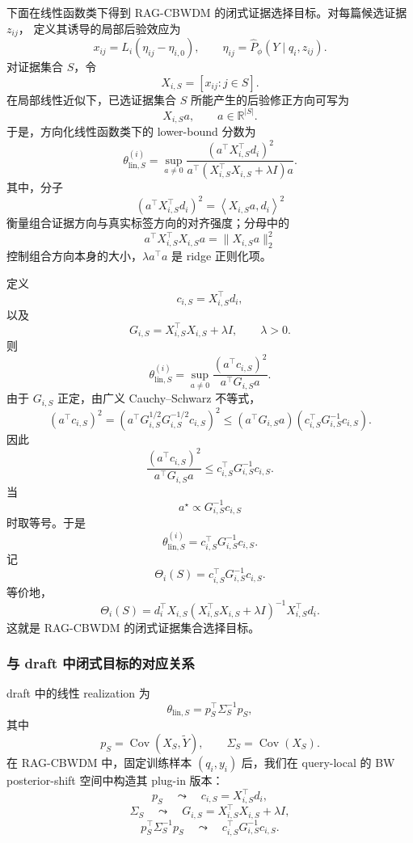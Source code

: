 \documentclass[UTF8,a4paper,12pt,oneside]{ctexart}
\numberwithin{equation}{section}
\begin{document}
下面在线性函数类下得到 RAG-CBWDM 的闭式证据选择目标。对每篇候选证据 \(z_{ij}\)，
定义其诱导的局部后验效应为
\[
    x_{ij}
    =
    L_i(\eta_{ij}-\eta_{i,0}),
    \qquad
    \eta_{ij}
    =
    \widehat P_\phi(Y\mid q_i,z_{ij}).
\]
对证据集合 \(S\)，令
\[
    X_{i,S}
    =
    [x_{ij}:j\in S].
\]
在局部线性近似下，已选证据集合 \(S\) 所能产生的后验修正方向可写为
\[
    X_{i,S}a,
    \qquad
    a\in\mathbb R^{|S|}.
\]
于是，方向化线性函数类下的 lower-bound 分数为
\[
    \theta_{\mathrm{lin},S}^{(i)}
    =
    \sup_{a\neq 0}
    \frac{
        \left(
            a^\top X_{i,S}^{\top}d_i
        \right)^2
    }{
        a^\top
        \left(
            X_{i,S}^{\top}X_{i,S}
            +
            \lambda I
        \right)
        a
    }.
\]
其中，分子
\[
    \left(
        a^\top X_{i,S}^{\top}d_i
    \right)^2
    =
    \left\langle
        X_{i,S}a,
        d_i
    \right\rangle^2
\]
衡量组合证据方向与真实标签方向的对齐强度；分母中的
\[
    a^\top X_{i,S}^{\top}X_{i,S}a
    =
    \|X_{i,S}a\|_2^2
\]
控制组合方向本身的大小，\(\lambda a^\top a\) 是 ridge 正则化项。

定义
\[
    c_{i,S}
    =
    X_{i,S}^{\top}d_i,
\]
以及
\[
    G_{i,S}
    =
    X_{i,S}^{\top}X_{i,S}
    +
    \lambda I,
    \qquad
    \lambda>0.
\]
则
\[
    \theta_{\mathrm{lin},S}^{(i)}
    =
    \sup_{a\neq 0}
    \frac{
        (a^\top c_{i,S})^2
    }{
        a^\top G_{i,S}a
    }.
\]
由于 \(G_{i,S}\) 正定，由广义 Cauchy--Schwarz 不等式，
\[
    (a^\top c_{i,S})^2
    =
    \left(
        a^\top G_{i,S}^{1/2}
        G_{i,S}^{-1/2}c_{i,S}
    \right)^2
    \le
    (a^\top G_{i,S}a)
    (c_{i,S}^{\top}G_{i,S}^{-1}c_{i,S}).
\]
因此
\[
    \frac{
        (a^\top c_{i,S})^2
    }{
        a^\top G_{i,S}a
    }
    \le
    c_{i,S}^{\top}G_{i,S}^{-1}c_{i,S}.
\]
当
\[
    a^\star
    \propto
    G_{i,S}^{-1}c_{i,S}
\]
时取等号。于是
\[
    \theta_{\mathrm{lin},S}^{(i)}
    =
    c_{i,S}^{\top}G_{i,S}^{-1}c_{i,S}.
\]
记
\[
    \Theta_i(S)
    =
    c_{i,S}^{\top}G_{i,S}^{-1}c_{i,S}.
\]
等价地，
\[
    \Theta_i(S)
    =
    d_i^\top
    X_{i,S}
    \left(
        X_{i,S}^{\top}X_{i,S}
        +
        \lambda I
    \right)^{-1}
    X_{i,S}^{\top}
    d_i.
\]
这就是 RAG-CBWDM 的闭式证据集合选择目标。

\subsubsection{与 draft 中闭式目标的对应关系}

draft 中的线性 realization 为
\[
    \theta_{\mathrm{lin},S}
    =
    p_S^\top\Sigma_S^{-1}p_S,
\]
其中
\[
    p_S=\operatorname{Cov}(X_S,\widetilde Y),
    \qquad
    \Sigma_S=\operatorname{Cov}(X_S).
\]
在 RAG-CBWDM 中，固定训练样本 \((q_i,y_i)\) 后，我们在 query-local 的 BW posterior-shift
空间中构造其 plug-in 版本：
\[
    p_S
    \quad\leadsto\quad
    c_{i,S}=X_{i,S}^{\top}d_i,
\]
\[
    \Sigma_S
    \quad\leadsto\quad
    G_{i,S}=X_{i,S}^{\top}X_{i,S}+\lambda I,
\]
\[
    p_S^\top\Sigma_S^{-1}p_S
    \quad\leadsto\quad
    c_{i,S}^{\top}G_{i,S}^{-1}c_{i,S}.
\]
\end{document}
